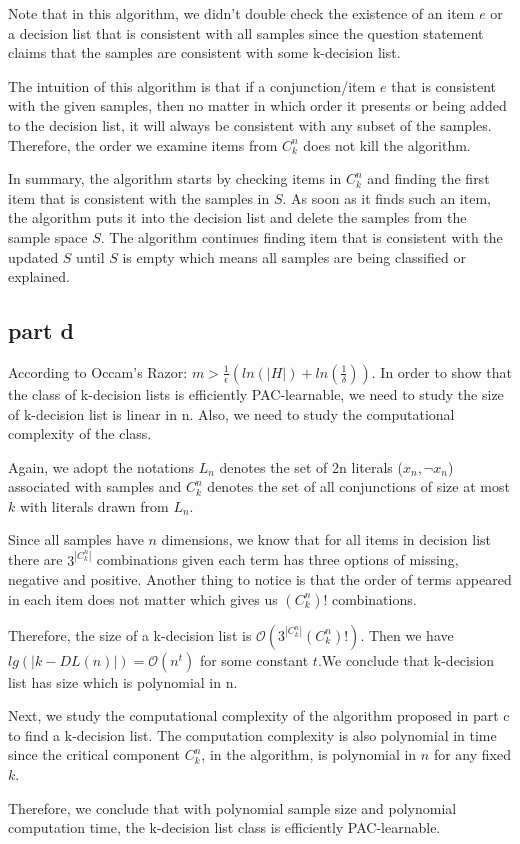 Note that in this algorithm, we didn't double check the existence of an item $e$ or a decision list that is consistent with all samples since the question statement claims that the samples are consistent with some k-decision list.

The intuition of this algorithm is that if a conjunction/item $e$ that is consistent with the given samples, then no matter in which order it presents or being added to the decision list, it will always be consistent with any subset of the samples. Therefore, the order we examine items from $C_k^n$ does not kill the algorithm.

In summary, the algorithm starts by checking items in $C_k^n$ and finding the first item that is consistent with the samples in $S$. As soon as it finds such an item, the algorithm puts it into the decision list and delete the samples from the sample space $S$. The algorithm continues finding item that is consistent with the updated $S$ until $S$ is empty which means all samples are being classified or explained.

\subsection{part d}

According to Occam's Razor: $m>\frac{1}{\epsilon}(ln(|H|)+ln(\frac{1}{\delta}))$. In order to show that the class of k-decision lists is efficiently PAC-learnable, we need to study the size of k-decision list is linear in n. Also, we need to study the computational complexity of the class.

Again, we adopt the notations $L_n$ denotes the set of 2n literals ($x_n, \neg{x_n}$) associated with samples and $C_k^n$ denotes the set of all conjunctions of size at most $k$ with literals drawn from $L_n$.

Since all samples have $n$ dimensions, we know that for all items in decision list there are $3^{|C_k^n|}$ combinations given each term has three options of missing, negative and positive. Another thing to notice is that the order of terms appeared in each item does not matter which gives us $(C_k^n)!$ combinations.

Therefore, the size of a k-decision list is $\mathcal{O}(3^{|C_k^n|}(C_k^n)!)$. Then we have $lg(|k-DL(n)|) = \mathcal{O}(n^t)$ for some constant $t$.We conclude that k-decision list has size which is polynomial in n.

Next, we study the computational complexity of the algorithm proposed in part c to find a k-decision list. The computation complexity is also polynomial in time since the critical component $C_k^n$, in the algorithm, is polynomial in $n$ for any fixed $k$.

Therefore, we conclude that with polynomial sample size and polynomial computation time, the k-decision list class is efficiently PAC-learnable.










